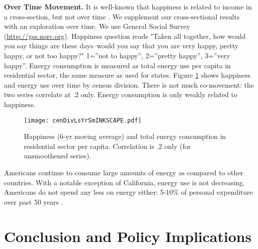 \documentclass[10pt, letterpaper]{article}
\begin{document}
\begin{spacing}{1.0}
{\bf Over Time Movement.} It is well-known that happiness is related to income
in  a 
cross-section, but not over time \citep{easterlin74,easterlin12}. We
supplement our cross-sectional results with an exploration over time. We use General
Social Survey (\url{http://gss.norc.org}).   %
Happiness question reads "Taken all together, how would you say things are
      these days--would you say that you are very happy, pretty happy, or not
      too happy?" 1=''not to happy'', 2=''pretty happy'', 3=''very happy''. 
 Energy consumption is measured as total energy use per capita in
residential sector, the same measure as used for states. 
Figure \ref{cenDivLsYrSm} shows happiness and energy use over time by
census division. There is not much co-movement: the two series correlate at
.2 only. Energy consumption is only weakly related to happiness. 

\begin{figure}[H]
 \texttt{[image: cenDivLsYrSmINKSCAPE.pdf]}\centering
\caption{Happiness (6-yr moving average) and total energy consumption
  in residential sector per capita. Correlation is .2 only (for unsmoothened series).
}\label{cenDivLsYrSm}
\end{figure}

Americans continue to consume large amounts of energy as compared to other
countries.  With a notable exception of California, energy use is
not decreasing. %
 Americans do not spend any less  on energy either: 5-10\% of personal
expenditure over past 50 years %
 \citep{bea-2-8-5}.


\section*{\large \bf Conclusion and Policy Implications} %


\end{spacing}
\end{document}
